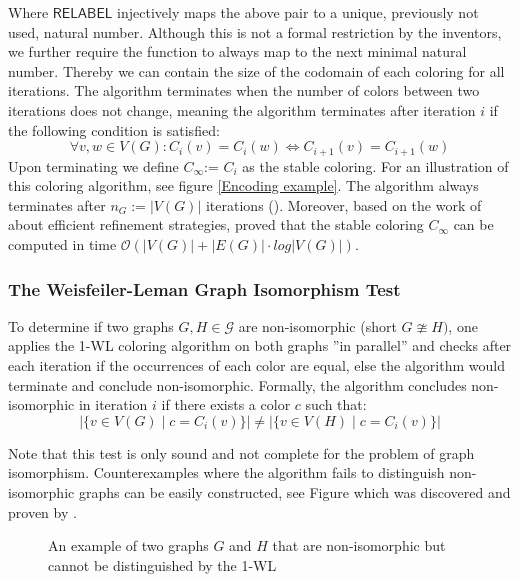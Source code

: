 \documentclass[11pt, dvipsnames, DIV=12]{scrreprt}
\theoremstyle{definition}
\begin{document}
\noindent Where $\textsf{RELABEL}$ injectively maps the above pair to a unique, previously not used, natural number. Although this is not a formal restriction by the inventors, we further require the function to always map to the next minimal natural number. Thereby we can contain the size of the codomain of each coloring for all iterations. The algorithm terminates when the number of colors between two iterations does not change, meaning the algorithm terminates after iteration $i$ if the following condition is satisfied:
\begin{equation}
\forall v,w \in V(G):  C_i(v) = C_i(w) \iff C_{i+1}(v) = C_{i+1}(w)
\end{equation}
Upon terminating we define $C_{\infty}$:= $C_i$ as the stable coloring. For an illustration of this coloring algorithm, see figure \ref{Encoding example}. The algorithm always terminates after $n_G:= |V(G)|$ iterations (\cite{Gro2017}). Moreover, based on the work of \cite{Pai+87} about efficient refinement strategies, \cite{Car+82} proved that the stable coloring $C_\infty$ can be computed in time $\mathcal{O}(| V(G) | + |E(G)| \cdot log | V(G) |)$.

\subsubsection{The Weisfeiler-Leman Graph Isomorphism Test}
To determine if two graphs $G, H \in \mathcal{G}$ are non-isomorphic (short $G \ncong H)$, one applies the 1-WL coloring algorithm on both graphs ''in parallel'' and checks after each iteration if the occurrences of each color are equal, else the algorithm would terminate and conclude non-isomorphic. Formally, the algorithm concludes non-isomorphic in iteration $i$ if there exists a color $c$ such that: 
\begin{equation}
    |\{ v \in V(G) \mid c = C_i(v)\} | \neq |\{ v \in V(H) \mid c = C_i(v)\} |
\end{equation}

Note that this test is only sound and not complete for the problem of graph isomorphism. Counterexamples where the algorithm fails to distinguish non-isomorphic graphs can be easily constructed, see Figure  which was discovered and proven by \cite{Cai1992}.

\begin{figure}[H]
    \centering
    
    \caption{An example of two graphs $G$ and $H$ that are non-isomorphic but cannot be distinguished by the 1-WL}
    \label{1-WL Counter Example}
\end{figure}
\end{document}
